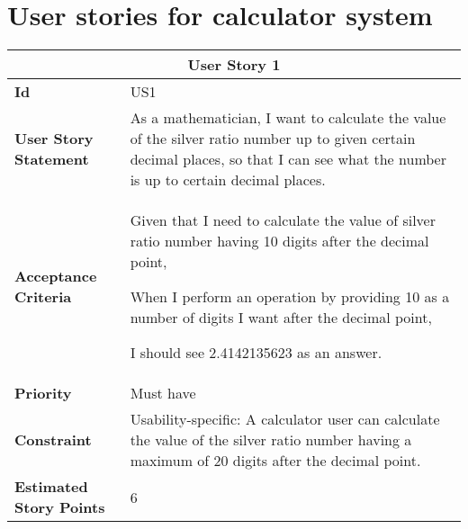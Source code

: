 \section{User stories for calculator system}

\hspace{1cm}
\begin{center}
\begin{tabular}{ | m{2cm} | m{12cm} | } 

 \hline
 \multicolumn{2}{|c|}{\textbf{User Story 1}} \\

\hline
\textbf{Id} & US1 \\ 

\hline
\textbf{User Story Statement} & As a mathematician, I want to calculate the value of the silver ratio number up to given certain decimal places, so that I can see what the number is up to certain decimal places. \\ 

\hline
\textbf{Acceptance Criteria} & Given that I need to calculate the value of silver ratio number having 10 digits after the decimal point,

When I perform an operation by providing 10 as a number of digits I want after the decimal point,

I should see 2.4142135623 as an answer.\\ 

\hline
\textbf{Priority} & Must have \\ 

\hline
\textbf{Constraint} & Usability-specific: A calculator user can calculate the value of the silver ratio number having a maximum of 20 digits after the decimal point.\\ 

\hline
\textbf{Estimated Story Points} & 6 \\ 
\hline

\end{tabular}
\end{center}


